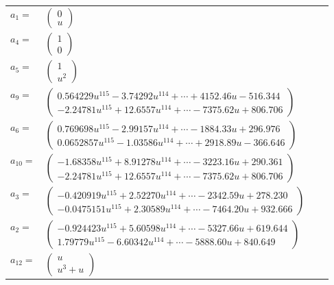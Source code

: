 \documentclass[1p]{elsarticle_modified}
\theoremstyle{definition}
\begin{document}
\begin{tabular}{m{7pt} m{180pt} m{7pt} m{180pt} }
\flushright $a_{1}=$&$\begin{pmatrix}0\\u\end{pmatrix}$ \\
\flushright $a_{4}=$&$\begin{pmatrix}1\\0\end{pmatrix}$ \\
\flushright $a_{5}=$&$\begin{pmatrix}1\\u^2\end{pmatrix}$ \\
\flushright $a_{9}=$&$\begin{pmatrix}0.564229 u^{115}-3.74292 u^{114}+\cdots+4152.46 u-516.344\\-2.24781 u^{115}+12.6557 u^{114}+\cdots-7375.62 u+806.706\end{pmatrix}$ \\
\flushright $a_{6}=$&$\begin{pmatrix}0.769698 u^{115}-2.99157 u^{114}+\cdots-1884.33 u+296.976\\0.0652857 u^{115}-1.03586 u^{114}+\cdots+2918.89 u-366.646\end{pmatrix}$ \\
\flushright $a_{10}=$&$\begin{pmatrix}-1.68358 u^{115}+8.91278 u^{114}+\cdots-3223.16 u+290.361\\-2.24781 u^{115}+12.6557 u^{114}+\cdots-7375.62 u+806.706\end{pmatrix}$ \\
\flushright $a_{3}=$&$\begin{pmatrix}-0.420919 u^{115}+2.52270 u^{114}+\cdots-2342.59 u+278.230\\-0.0475151 u^{115}+2.30589 u^{114}+\cdots-7464.20 u+932.666\end{pmatrix}$ \\
\flushright $a_{2}=$&$\begin{pmatrix}-0.924423 u^{115}+5.60598 u^{114}+\cdots-5327.66 u+619.644\\1.79779 u^{115}-6.60342 u^{114}+\cdots-5888.60 u+840.649\end{pmatrix}$ \\
\flushright $a_{12}=$&$\begin{pmatrix}u\\u^3+u\end{pmatrix}$ \\

\end{tabular}
\end{document}
